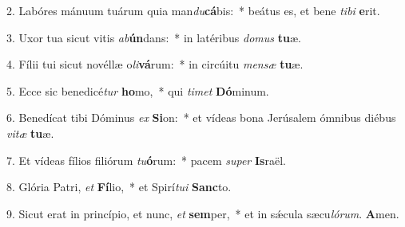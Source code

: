 2. Labóres mánuum tuárum quia man\textit{du}\textbf{cá}bis:~*  beátus es, et bene \textit{ti}\textit{bi} \textbf{e}rit.\

3. Uxor tua sicut vitis \textit{ab}\textbf{ún}dans:~*  in latéribus \textit{do}\textit{mus} \textbf{tu}æ.\

4. Fílii tui sicut novéllæ o\textit{li}\textbf{vá}rum:~*  in circúitu \textit{men}\textit{sæ} \textbf{tu}æ.\

5. Ecce sic benedicé\textit{tur} \textbf{ho}mo,~*  qui \textit{ti}\textit{met} \textbf{Dó}minum.\

6. Benedícat tibi Dóminus \textit{ex} \textbf{Si}on:~*  et vídeas bona Jerúsalem ómnibus diébus \textit{vi}\textit{tæ} \textbf{tu}æ.\

7. Et vídeas fílios filiórum \textit{tu}\textbf{ó}rum:~*  pacem \textit{su}\textit{per} \textbf{Is}raël.\

8. Glória Patri, \textit{et} \textbf{Fí}lio,~*  et Spirí\textit{tu}\textit{i} \textbf{Sanc}to.\

9. Sicut erat in princípio, et nunc, \textit{et} \textbf{sem}per,~*  et in sǽcula sæcu\textit{ló}\textit{rum}. \textbf{A}men.\

